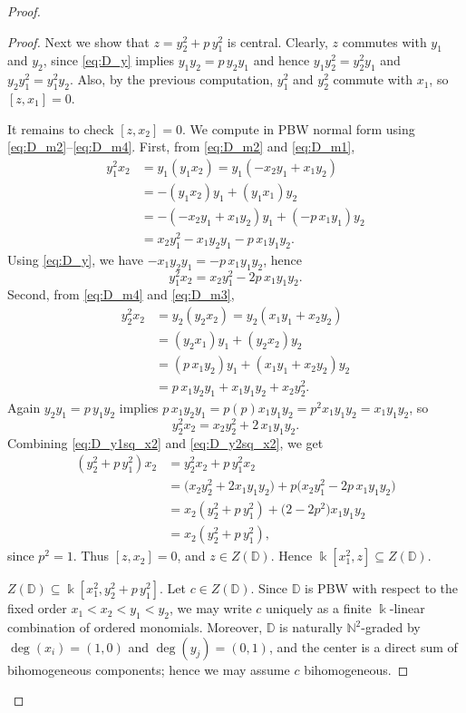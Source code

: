\documentclass{amsart}
\theoremstyle{definition}
\theoremstyle{remark}
\numberwithin{equation}{section}
\begin{document}
\begin{proof}
\begin{proof}
Next we show that \(z=y_2^2+p\,y_1^2\) is central. Clearly, \(z\) commutes with \(y_1\) and \(y_2\),
since \eqref{eq:D_y} implies \(y_1y_2=p\,y_2y_1\) and hence
\(y_1y_2^2=y_2^2y_1\) and \(y_2y_1^2=y_1^2y_2\).
Also, by the previous computation, \(y_1^2\) and \(y_2^2\) commute with \(x_1\), so \([z,x_1]=0\).

It remains to check \([z,x_2]=0\). We compute in PBW normal form using \eqref{eq:D_m2}--\eqref{eq:D_m4}.
First, from \eqref{eq:D_m2} and \eqref{eq:D_m1},
\begin{align*}
y_1^2x_2&=y_1(y_1x_2)=y_1(-x_2y_1+x_1y_2)\\
&=-(y_1x_2)y_1+(y_1x_1)y_2\\
&=-(-x_2y_1+x_1y_2)y_1+(-p\,x_1y_1)y_2\\
&=x_2y_1^2-x_1y_2y_1-p\,x_1y_1y_2.
\end{align*}
Using \eqref{eq:D_y}, we have \(-x_1y_2y_1=-p\,x_1y_1y_2\), hence
\begin{equation}\label{eq:D_y1sq_x2}
y_1^2x_2=x_2y_1^2-2p\,x_1y_1y_2.
\end{equation}
Second, from \eqref{eq:D_m4} and \eqref{eq:D_m3},
\begin{align*}
y_2^2x_2&=y_2(y_2x_2)=y_2(x_1y_1+x_2y_2)\\
&=(y_2x_1)y_1+(y_2x_2)y_2\\
&=(p\,x_1y_2)y_1+(x_1y_1+x_2y_2)y_2\\
&=p\,x_1y_2y_1+x_1y_1y_2+x_2y_2^2.
\end{align*}
Again \(y_2y_1=p\,y_1y_2\) implies \(p\,x_1y_2y_1=p(p)x_1y_1y_2=p^2x_1y_1y_2=x_1y_1y_2\), so
\begin{equation}\label{eq:D_y2sq_x2}
y_2^2x_2=x_2y_2^2+2\,x_1y_1y_2.
\end{equation}
Combining \eqref{eq:D_y1sq_x2} and \eqref{eq:D_y2sq_x2}, we get
\begin{align*}
(y_2^2+p\,y_1^2)x_2
&=y_2^2x_2+p\,y_1^2x_2\\
&=\big(x_2y_2^2+2x_1y_1y_2\big)+p\big(x_2y_1^2-2p\,x_1y_1y_2\big)\\
&=x_2(y_2^2+p\,y_1^2)+\big(2-2p^2\big)x_1y_1y_2\\
&=x_2(y_2^2+p\,y_1^2),
\end{align*}
since \(p^2=1\). Thus \([z,x_2]=0\), and \(z\in Z(\mathbb{D})\). Hence \(\Bbbk[x_1^2,z]\subseteq Z(\mathbb{D})\).

 \(Z(\mathbb{D})\subseteq \Bbbk[x_1^2,y_2^2+p\,y_1^2]\).
Let \(c\in Z(\mathbb{D})\). Since \(\mathbb{D}\) is PBW with respect to the fixed order \(x_1<x_2<y_1<y_2\),
we may write \(c\) uniquely as a finite \(\Bbbk\)-linear combination of ordered monomials.
Moreover, \(\mathbb{D}\) is naturally \(\mathbb{N}^2\)-graded by \(\deg(x_i)=(1,0)\) and \(\deg(y_j)=(0,1)\),
and the center is a direct sum of bihomogeneous components; hence we may assume \(c\) bihomogeneous.


\end{proof}
\end{proof}
\end{document}
